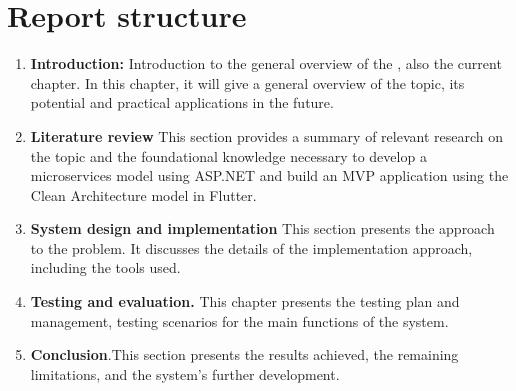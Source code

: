 \section{Report structure}
\begin{enumerate}[label=\bfseries Chapter \arabic*.,leftmargin=*]
    \item \textbf{Introduction:} Introduction to the general overview of the , also the current chapter. In this chapter, it will give a general overview of the topic, its potential and practical applications in the future.
    \item \textbf{Literature review} This section provides a summary of relevant research on the topic and the foundational knowledge necessary to develop a microservices model using ASP.NET and build an MVP application using the Clean Architecture model in Flutter.
    \item \textbf{System design and implementation} This section presents the approach to the problem. It discusses the details of the implementation approach, including the tools used.
    \item \textbf{Testing and evaluation.} This chapter presents the testing plan and management, testing scenarios for the main functions of the system.
    \item \textbf{Conclusion}.This section presents the results achieved, the remaining limitations, and the system's further development.
\end{enumerate}


